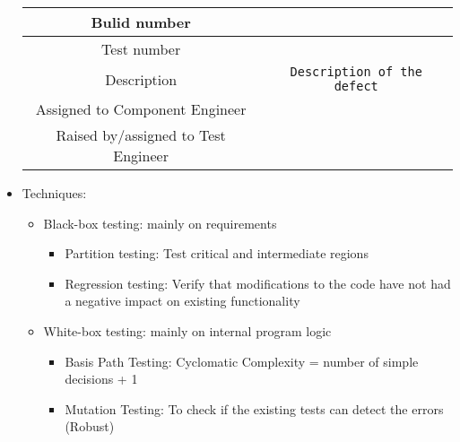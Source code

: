 \documentclass[12pt,openany]{book}
\begin{document}
\begin{itemize}
\begin{table}[H]
\begin{tabular}{|c|c|}
            \hline
            Bulid number&\\
            \hline
            Test number&\\
            \hline
            Description&\texttt{Description of the defect}\\
            \hline
            Assigned to Component Engineer&\\
            \hline
            Raised by/assigned to Test Engineer&\\
            \hline
        \end{tabular}
    \end{table}
    \item Techniques:
    \begin{itemize}
        \item Black-box testing: mainly on requirements
        \begin{itemize}
            \item Partition testing: Test critical and intermediate regions
            \item Regression testing: Verify that modifications to the code have not had a negative impact on existing functionality
        \end{itemize}
        \item White-box testing: mainly on internal program logic
        \begin{itemize}
            \item Basis Path Testing: Cyclomatic Complexity = number of simple decisions + 1
            \item Mutation Testing: To check if the existing tests can detect the errors (Robust)
        \end{itemize}
    \end{itemize}
\end{itemize}
\end{document}
